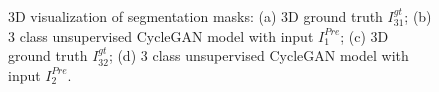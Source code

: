 \begin{figure}[!htb]
\centering
{}\hfil
{}

\hfil 
{}

\caption{3D visualization of segmentation masks: (a) 3D ground truth $I^{gt}_{31}$; (b) 3 class unsupervised CycleGAN model with input $I^{Pre}_1$; (c) 3D ground truth $I^{gt}_{32}$; (d) 3 class unsupervised CycleGAN model with input $I^{Pre}_2$.}

\label{fig:results-cycleGAN-3channel}



\end{figure}

